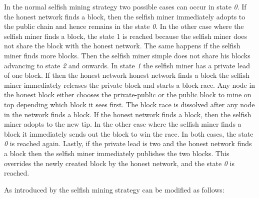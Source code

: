 In the normal selfish mining strategy two possible cases can occur in state \textit{0}.
If the honest network finds a block, then the selfish miner immediately adopts to the public chain and hence remains in the state \textit{0}.
In the other case where the selfish miner finds a block, the state 1 is reached because the selfish miner does not share the block with the honest network.
The same happens if the selfish miner finds more blocks.
Then the selfish miner simple does not share his blocks advancing to state \textit{2} and onwards.
In state \textit{1} the selfish miner has a private lead of one block.
If then the honest network honest network finds a block the selfish miner immediately releases the private block and starts a block race.
Any node in the honest block either chooses the private-public or the public block to mine on top depending which block it sees first.
The block race is dissolved after any node in the network finds a block.
If the honest network finds a block, then the selfish miner adopts to the new tip.
In the other case where the selfish miner finds a block it immediately sends out the block to win the race.
In both cases, the state \textit{0} is reached again.
Lastly, if the private lead is two and the honest network finds a block then the selfish miner immediately publishes the two blocks.
This overrides the newly created block by the honest network, and the state \textit{0} is reached.

As introduced by \cite{nayak2016stubborn} the selfish mining strategy can be modified as follows:

